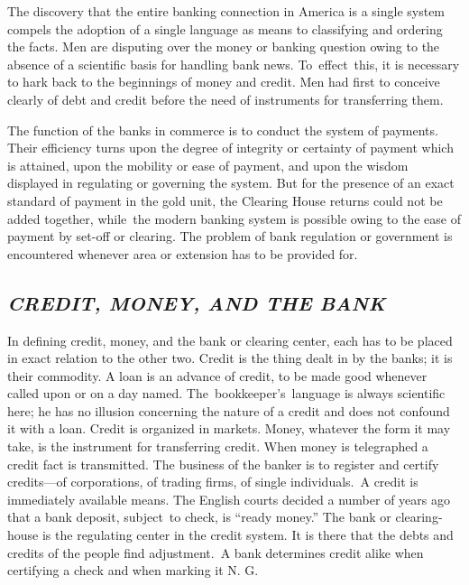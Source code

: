 \documentclass[openany,nobib]{tufte-book}
\begin{document}
The discovery that the entire banking connection in America is a single
system compels the adoption of a single language as means to classifying
and ordering the facts. Men are disputing over the money or banking
question owing to the absence of a scientific basis for handling bank
news. To~effect~this, it is necessary to hark back to the beginnings of
money and credit. Men had first to conceive clearly of debt and credit
before the need of instruments for transferring them.~

The function of the banks in commerce is to conduct the system of
payments. Their efficiency turns upon the degree of integrity or
certainty of payment which is attained, upon the mobility or ease of
payment, and upon the wisdom displayed in regulating or governing the
system. But for the presence of an exact standard of payment in the gold
unit, the Clearing House returns could not be added together, while~the
modern banking system is possible owing to the ease of payment by
set-off or clearing. The problem of bank regulation or government is
encountered whenever area or extension has to be provided for.~ ~

\hypertarget{credit-money-and-the-bank}{%
\subsection{\texorpdfstring{\emph{CREDIT, MONEY, AND THE
BANK}}{CREDIT, MONEY, AND THE BANK}}\label{credit-money-and-the-bank}}

In defining credit, money, and the bank or clearing center, each has to
be placed in exact relation to the other two. Credit is the thing dealt
in by the banks; it is their commodity. A loan is an advance of credit,
to be made good whenever called upon or on a day named.
The~bookkeeper's~language is always scientific here; he has no illusion
concerning the nature of a credit and does not confound it with a loan.
Credit is organized in markets. Money, whatever the form it may take, is
the instrument for transferring credit. When money is telegraphed a
credit fact is transmitted. The business of the banker is to register
and certify credits---of corporations, of trading firms, of single
individuals.~A credit is immediately available means. The English courts
decided a number of years ago that a bank deposit, subject~to check, is
``ready money.'' The bank or clearing-house is the regulating center in
the credit system. It is there that the debts and credits of the people
find adjustment.~A bank determines credit alike when certifying a check
and when marking it N. G.~
\end{document}
